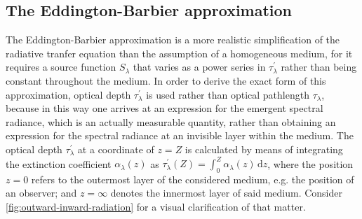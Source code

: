 \documentclass[a4paper,12pt]{report}
\begin{document}
\subsection{The Eddington-Barbier approximation}
The Eddington-Barbier approximation is a more realistic simplification of the radiative tranfer equation than the assumption of a homogeneous medium, for it requires a source function $S_\lambda$ that varies as a power series in $\tau_\lambda^\prime$ rather than being constant throughout the medium. In order to derive the exact form of this approximation, optical depth $\tau_\lambda^\prime$ is used rather than optical pathlength $\tau_\lambda$, because in this way one arrives at an expression for the emergent spectral radiance, which is an actually measurable quantity, rather than obtaining an expression for the spectral radiance at an invisible layer within the medium. The optical depth $\tau_\lambda^\prime$ at a coordinate of $z=Z$ is calculated by means of integrating the extinction coefficient $\alpha_\lambda(z)$ as $
\tau_\lambda^\prime(Z) = \int_{0}^{Z} \alpha_\lambda(z)\,\mathrm{d}z$, where the position $z=0$ refers to the outermost layer of the considered medium, e.g. the position of an observer; and $z=\infty$ denotes the innermost layer of said medium. Consider \cref{fig:outward-inward-radiation} for a visual clarification of that matter.
\end{document}
